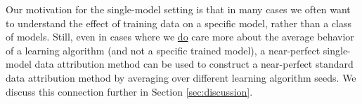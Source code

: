 \begin{remark}
  Our motivation for the single-model setting is that in many cases
  we often want to understand the effect of training data on a
  specific model, rather than a class of models.
  Still, even in cases where we \underline{do} care more about 
  the average behavior of a learning algorithm (and not  
  a specific trained model), a near-perfect single-model data attribution
  method can be used to construct a near-perfect standard data
  attribution method by averaging over different learning algorithm seeds.
  We discuss this connection further in Section \ref{sec:discussion}.
\end{remark}



